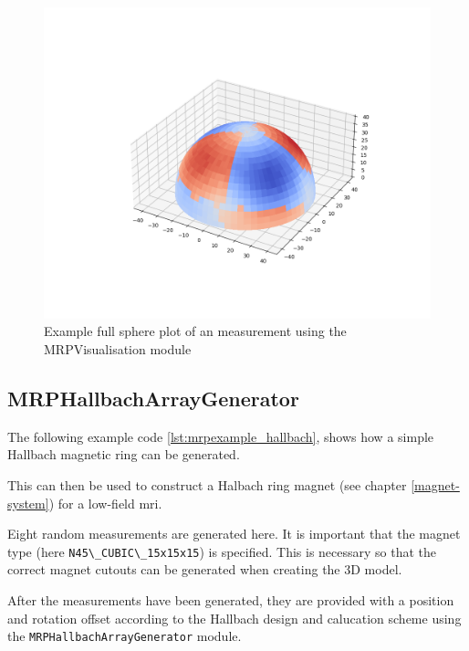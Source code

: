 \begin{figure}
\centering
\includegraphics{./generated_images/border_Example_full_sphere_plot_of_an_measurement_using_the_MRPVisualisation_module.png}
\caption{Example full sphere plot of an measurement using the
MRPVisualisation module
\label{Example_full_sphere_plot_of_an_measurement_using_the_MRPVisualisation_module.png}}
\end{figure}

\hypertarget{mrphallbacharraygenerator}{%
\subsection{MRPHallbachArrayGenerator}\label{mrphallbacharraygenerator}}

The following example code \ref{lst:mrpexample_hallbach}, shows how a
simple Hallbach magnetic ring can be generated.

This can then be used to construct a Halbach ring magnet (see chapter
\ref{magnet-system}) for a low-field \gls{mri}.

Eight random measurements are generated here. It is important that the
magnet type (here \passthrough{\lstinline!N45\_CUBIC\_15x15x15!}) is
specified. This is necessary so that the correct magnet cutouts can be
generated when creating the 3D model.

After the measurements have been generated, they are provided with a
position and rotation offset according to the Hallbach design and
calucation scheme \cite{HallbachMagnetDesignPaper} using the
\passthrough{\lstinline!MRPHallbachArrayGenerator!} module.

